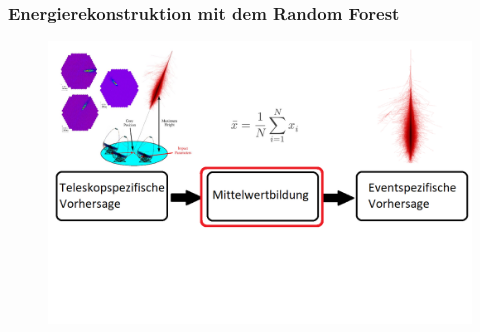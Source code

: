 \documentclass[aspectratio=1610, professionalfonts, 9pt]{beamer}
\begin{document}
  \begin{frame}
    \frametitle{Energierekonstruktion mit dem Random Forest}
    \begin{figure}
      \includegraphics[width=\textwidth]{pictures/Ablauf11.png}
      \caption{}
      \label{}
    \end{figure}
  \end{frame}
\end{document}
